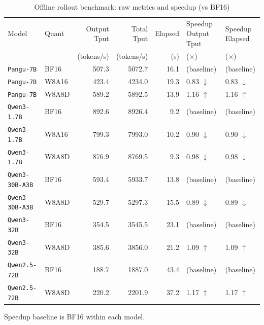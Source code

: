 \documentclass[11pt]{article}
\begin{document}
\begin{table}
\centering
\footnotesize
\renewcommand{\arraystretch}{1.12}
\begin{threeparttable}
\caption{Offline rollout benchmark: raw metrics and speedup (vs BF16)}
\begin{tabular}{>{\raggedright\arraybackslash}p{3.2cm} l r r r l l}
\toprule
Model & Quant & Output Tput & Total Tput & Elapsed & Speedup Output Tput & Speedup Elapsed \\
 &  & (tokens/s) & (tokens/s) & (s) & ($\times$) & ($\times$) \\
\midrule
\texttt{Pangu-7B}      & BF16  & 507.3 & 5072.7 & 16.1 & (baseline) & (baseline) \\
\texttt{Pangu-7B}      & W8A16 & 423.4 & 4234.0 & 19.3 & 0.83 $\downarrow$ & 0.83 $\downarrow$ \\
\texttt{Pangu-7B}      & W8A8D & 589.2 & 5892.5 & 13.9 & 1.16 $\uparrow$ & 1.16 $\uparrow$ \\
\midrule
\texttt{Qwen3-1.7B}    & BF16  & 892.6 & 8926.4 & 9.2  & (baseline) & (baseline) \\
\texttt{Qwen3-1.7B}    & W8A16 & 799.3 & 7993.0 & 10.2 & 0.90 $\downarrow$ & 0.90 $\downarrow$ \\
\texttt{Qwen3-1.7B}    & W8A8D & 876.9 & 8769.5 & 9.3  & 0.98 $\downarrow$ & 0.98 $\downarrow$ \\
\midrule
\texttt{Qwen3-30B-A3B} & BF16  & 593.4 & 5933.7 & 13.8 & (baseline) & (baseline) \\
\texttt{Qwen3-30B-A3B} & W8A8D & 529.7 & 5297.3 & 15.5 & 0.89 $\downarrow$ & 0.89 $\downarrow$ \\
\midrule
\texttt{Qwen3-32B}     & BF16  & 354.5 & 3545.5 & 23.1 & (baseline) & (baseline) \\
\texttt{Qwen3-32B}     & W8A8D & 385.6 & 3856.0 & 21.2 & 1.09 $\uparrow$ & 1.09 $\uparrow$ \\
\midrule
\texttt{Qwen2.5-72B}   & BF16  & 188.7 & 1887.0 & 43.4 & (baseline) & (baseline) \\
\texttt{Qwen2.5-72B}   & W8A8D & 220.2 & 2201.9 & 37.2 & 1.17 $\uparrow$ & 1.17 $\uparrow$ \\
\bottomrule
\end{tabular}
\begin{tablenotes}
\footnotesize
\item Speedup baseline is BF16 within each model.
\end{tablenotes}
\end{threeparttable}
\end{table}
\end{document}
